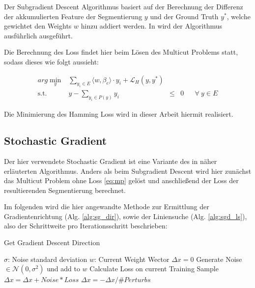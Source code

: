 Der Subgradient Descent Algorithmus basiert auf der Berechnung der Differenz der akkumulierten Feature der Segmentierung $y$ und der Ground Truth $y^*$, welche gewichtet den Weights $w$ hinzu addiert werden. In \cite{NowozinStrucLearn11} wird der Algorithmus ausführlich ausgeführt. 

Die Berechnung des Loss findet hier beim Lösen des Multicut Problems statt, sodass dieses wie folgt aussieht:

\begin{equation} 
\begin{array}{rrclcl}
\displaystyle arg \min_{y} & \sum\limits_{y_i \in E} \langle w, \beta_e \rangle \cdot y_i + \mathcal{L}_H(y, y^*) \\
\textrm{s.t.} &  y - \sum\limits_{y_i \in P(y)} y_i & \le & 0 & & \forall \ y \in E
\end{array}
\label{eq:mp-hamming}
\end{equation}

Die Minimierung des Hamming Loss wird in dieser Arbeit hiermit realisiert.

\subsection{Stochastic Gradient}

Der hier verwendete Stochastic Gradient ist eine Variante des in \cite{NowozinStrucLearn11} näher erläuterten Algorithmus. Anders als beim Subgradient Descent wird hier zunächst das Multicut Problem ohne Loss \eqref{eq:mp} gelöst und anschließend der Loss der resultierenden Segmentierung berechnet.

Im folgenden wird die hier angewandte Methode zur Ermittlung der Gradientenrichtung (Alg. \ref{alg:sg_dir}), sowie der Liniensuche (Alg. \ref{alg:sgd_ls}), also der Schrittweite pro Iterationsschritt beschrieben: \\

\begin{algorithm}[H]
\caption{Get Gradient Descent Direction}\label{alg:sg_dir}
\begin{algorithmic}[1]
	\State $\sigma$: Noise standard deviation
	\State $w$: Current Weight Wector
	\State
	\State $\Delta x = 0$
		\State Generate Noise $\in \mathcal{N}(0, \sigma^2)$ und add to $w$
		\State Calculate Loss on current Training Sample
		\State $\Delta x = \Delta x + Noise*Loss$
	\EndFor
	\State $\Delta x = -\Delta x / \#Perturbs$
	\State {}
\EndProcedure
\end{algorithmic}
\end{algorithm}

